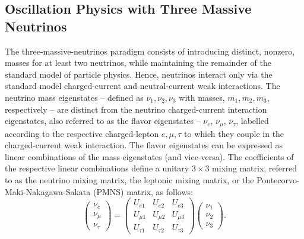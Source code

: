 \subsection{Oscillation Physics with Three Massive Neutrinos}

The three-massive-neutrinos paradigm consists of introducing distinct, nonzero, masses for at least two neutrinos, while maintaining the remainder of the standard model of particle physics. Hence, neutrinos interact only via the standard model charged-current and neutral-current weak interactions. The neutrino mass eigenstates -- defined as $\nu_1,\nu_2, \nu_3$ with masses, $m_1, m_2, m_3$, respectively -- are distinct from the neutrino charged-current interaction eigenstates, also referred to as the flavor eigenstates -- $\nu_e$, $\nu_{\mu}$, $\nu_{\tau}$, labelled according to the respective charged-lepton $e,\mu,\tau$ to which they couple in the charged-current weak interaction. The flavor eigenstates can be expressed as linear combinations of the mass eigenstates (and vice-versa). The coefficients of the respective linear combinations define a unitary $3\times 3$ mixing matrix, referred to as the neutrino mixing matrix, the leptonic mixing matrix, or the Pontecorvo-Maki-Nakagawa-Sakata (PMNS) matrix, as follows:
\begin{equation}
\left(\begin{array}{c} \nu_e \\ \nu_{\mu} \\ \nu_{\tau} \end{array}\right) = \left(\begin{array}{ccc} U_{e1} & U_{e2} & U_{e3} \\  U_{\mu1} & U_{\mu2} & U_{\mu3}  \\  U_{\tau1} & U_{\tau2} & U_{\tau3}  \end{array}\right) \left(\begin{array}{c} \nu_1 \\ \nu_2 \\ \nu_3 \end{array}\right).
\end{equation}
